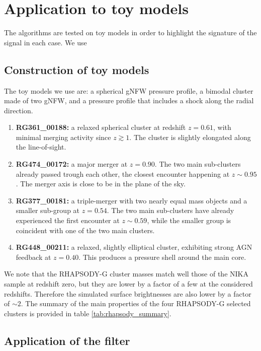 \documentclass[twocolumn,traditabstract]{aa}
\begin{document}
\section{Application to toy models}\label{sec:Application_to_toy_models}
The algorithms are tested on toy models in order to highlight the signature of the signal in each case. We use 

\subsection{Construction of toy models}

The toy models we use are: a spherical gNFW pressure profile, a bimodal cluster made of two gNFW, and a pressure profile that includes a shock along the radial direction.


\begin{enumerate}
\item {\bf RG361\_00188:} a relaxed spherical cluster at redshift $z = 0.61$, with minimal merging activity since $z \gtrsim 1$. The cluster is slightly elongated along the line-of-sight.
\item {\bf RG474\_00172:} a major merger at $z = 0.90$. The two main sub-clusters already passed trough each other, the closest encounter happening at $z \sim 0.95$. The merger axis is close to be in the plane of the sky. 
\item {\bf RG377\_00181:} a triple-merger with two nearly equal mass objects and a smaller sub-group at $z = 0.54$. The two main sub-clusters have already experienced the first encounter at $z \sim 0.59$, while the smaller group is coincident with one of the two main clusters.
\item {\bf RG448\_00211:} a relaxed, slightly elliptical cluster, exhibiting strong AGN feedback at $z = 0.40$. This produces a pressure shell around the main core.
\end{enumerate}
We note that the RHAPSODY-G cluster masses match well those of the NIKA sample at redshift zero, but they are lower by a factor of a few at the considered redshifts. Therefore the simulated surface brightnesses are also lower by a factor of $\sim 2$. The summary of the main properties of the four RHAPSODY-G selected clusters is provided in table \ref{tab:rhapsody_summary}.


\subsection{Application of the filter}
\end{document}

